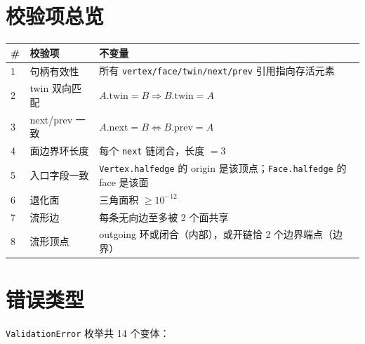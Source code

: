 \documentclass[11pt,a4paper]{article}
\begin{document}
\section{校验项总览}

\begin{center}
\renewcommand{\arraystretch}{1.18}
\begin{tabular}{@{}lll@{}}
  \toprule
  \textbf{\#} & \textbf{校验项} & \textbf{不变量} \\
  \midrule
  1 & 句柄有效性       & 所有 \texttt{vertex/face/twin/next/prev} 引用指向存活元素 \\
  2 & twin 双向匹配    & $A.\mathrm{twin} = B \Rightarrow B.\mathrm{twin} = A$ \\
  3 & next/prev 一致   & $A.\mathrm{next} = B \Leftrightarrow B.\mathrm{prev} = A$ \\
  4 & 面边界环长度     & 每个 \texttt{next} 链闭合，长度 $= 3$ \\
  5 & 入口字段一致     & \texttt{Vertex.halfedge} 的 origin 是该顶点；\texttt{Face.halfedge} 的 face 是该面 \\
  6 & 退化面           & 三角面积 $\ge 10^{-12}$ \\
  7 & 流形边           & 每条无向边至多被 2 个面共享 \\
  8 & 流形顶点         & outgoing 环或闭合（内部），或开链恰 2 个边界端点（边界） \\
  \bottomrule
\end{tabular}
\end{center}

\section{错误类型}

\texttt{ValidationError} 枚举共 14 个变体：
\end{document}
